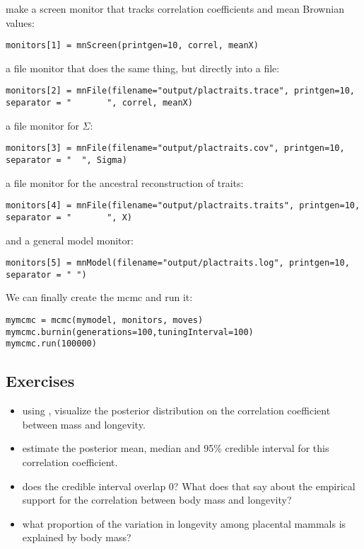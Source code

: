 make a screen monitor that tracks correlation coefficients and mean Brownian values:
{\tt \small \begin{snugshade*}
\begin{lstlisting}
monitors[1] = mnScreen(printgen=10, correl, meanX)
\end{lstlisting}
\end{snugshade*}}
a file monitor that does the same thing, but directly into a file:
{\tt \small \begin{snugshade*}
\begin{lstlisting}
monitors[2] = mnFile(filename="output/plactraits.trace", printgen=10, separator = "       ", correl, meanX)
\end{lstlisting}
\end{snugshade*}}
a file monitor for $\Sigma$:
{\tt \small \begin{snugshade*}
\begin{lstlisting}
monitors[3] = mnFile(filename="output/plactraits.cov", printgen=10, separator = "  ", Sigma)
\end{lstlisting}
\end{snugshade*}}
a file monitor for the ancestral reconstruction of traits:
{\tt \small \begin{snugshade*}
\begin{lstlisting}
monitors[4] = mnFile(filename="output/plactraits.traits", printgen=10, separator = "       ", X)
\end{lstlisting}
\end{snugshade*}}
and a general model monitor:
{\tt \small \begin{snugshade*}
\begin{lstlisting}
monitors[5] = mnModel(filename="output/plactraits.log", printgen=10, separator = " ")
\end{lstlisting}
\end{snugshade*}}
We can finally create the mcmc and run it:
{\tt \small \begin{snugshade*}
\begin{lstlisting}
mymcmc = mcmc(mymodel, monitors, moves)
mymcmc.burnin(generations=100,tuningInterval=100)
mymcmc.run(100000)
\end{lstlisting}
\end{snugshade*}}


\subsection*{Exercises}

\begin{itemize}
\item
using , visualize the posterior distribution on the correlation coefficient between mass and longevity.
\item
estimate the posterior mean, median and 95\% credible interval for this correlation coefficient.
\item
does the credible interval overlap 0? What does that say about the empirical support for the correlation between body mass and longevity?
\item
what proportion of the variation in longevity among placental mammals is explained by body mass?
\end{itemize}


